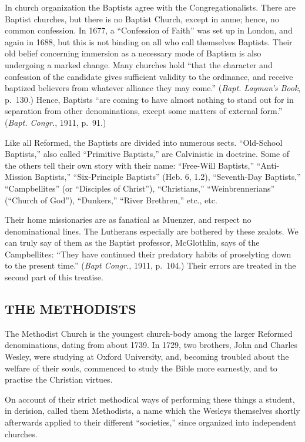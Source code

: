 \documentclass[
]{book}
\begin{document}
In church organization the Baptists agree with the Congregationalists. There are Baptist churches, but there is no Baptist Church, except in anme; hence, no common confession. In 1677, a ``Confession of Faith'' was set up in London, and again in 1688, but this is not binding on all who call themselves Baptists. Their old belief concerning immersion as a necessary mode of Baptism is also undergoing a marked change. Many churches hold ``that the character and confession of the candidate gives sufficient validity to the ordinance, and receive baptized believers from whatever alliance they may come.'' (\emph{Bapt. Layman's Book}, p.~130.) Hence, Baptists ``are coming to have almost nothing to stand out for in separation from other denominations, except some matters of external form.'' (\emph{Bapt. Congr.}, 1911, p.~91.)

Like all Reformed, the Baptists are divided into numerous sects. ``Old-School Baptists,'' also called ``Primitive Baptists,'' are Calvinistic in doctrine. Some of the others tell their own story with their name: ``Free-Will Baptists,'' ``Anti-Mission Baptists,'' ``Six-Principle Baptists'' (Heb. 6, 1.2), ``Seventh-Day Baptists,'' ``Campbellites'' (or ``Disciples of Christ''), ``Christians,'' ``Weinbrennerians'' (``Church of God''), ``Dunkers,'' ``River Brethren,'' etc., etc.

Their home missionaries are as fanatical as Muenzer, and respect no denominational lines. The Lutherans especially are bothered by these zealots. We can truly say of them as the Baptist professor, McGlothlin, says of the Campbellites: ``They have continued their predatory habits of proselyting down to the present time.'' (\emph{Bapt Congr.}, 1911, p.~104.) Their errors are treated in the second part of this treatise.

\hypertarget{the-methodists}{%
\subsection{THE METHODISTS}\label{the-methodists}}

The Methodist Church is the youngest church-body among the larger Reformed denominations, dating from about 1739. In 1729, two brothers, John and Charles Wesley, were studying at Oxford University, and, becoming troubled about the welfare of their souls, commenced to study the Bible more earnestly, and to practise the Christian virtues.

On account of their strict methodical ways of performing these things a student, in derision, called them Methodists, a name which the Wesleys themselves shortly afterwards applied to their different ``societies,'' since organized into independent churches.
\end{document}
